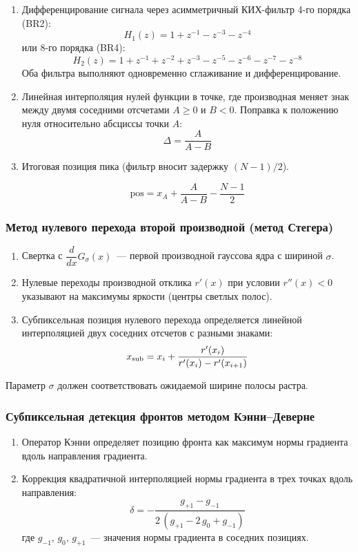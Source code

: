 \begin{enumerate}
\item Дифференцирование сигнала через асимметричный КИХ-фильтр 4-го порядка (BR2):
$$
H_1(z) = 1 + z^{-1} - z^{-3} - z^{-4}
$$
или 8-го порядка (BR4):
$$
H_2(z) = 1 + z^{-1} + z^{-2} + z^{-3} - z^{-5} - z^{-6} - z^{-7} - z^{-8}
$$
Оба фильтра выполняют одновременно сглаживание и дифференцирование.

\item Линейная интерполяция нулей функции в точке, где производная меняет знак между
двумя соседними отсчетами $A \geq 0$ и $B < 0$. 
Поправка к положению нуля относительно абсциссы точки $A$:
$$
\Delta = \frac{A}{A - B}
$$

\item Итоговая позиция пика (фильтр вносит задержку $(N-1)/2$).

$$\mathrm{pos} = x_A + \frac{A}{A-B} - \frac{N-1}{2}$$

\end{enumerate}

\subsubsection{Метод нулевого перехода второй производной (метод Стегера) \cite{steger_subpixel}}

\begin{enumerate}
\item Свертка с $\dfrac{d}{dx}G_\sigma(x)$~--- первой производной гауссова ядра
с шириной $\sigma$.

\item Нулевые переходы производной отклика $r'(x)$ при условии $r''(x) < 0$ указывают
на максимумы яркости (центры светлых полос).

\item Субпиксельная позиция нулевого перехода определяется линейной
интерполяцией двух соседних отсчетов с разными знаками:
$$
x_{\rm sub} = x_i + \frac{r'(x_i)}{r'(x_i) - r'(x_{i+1})}
$$
\end{enumerate}

Параметр $\sigma$ должен соответствовать ожидаемой ширине полосы растра.

\subsubsection{Субпиксельная детекция фронтов методом Кэнни–Деверне \cite{gioi_canny_devernay}}

\begin{enumerate}
\item Оператор Кэнни определяет позицию фронта как максимум нормы градиента вдоль
направления градиента.

\item Коррекция квадратичной интерполяцией нормы градиента в трех точках вдоль направления:
$$
\delta = -\frac{g_{+1} - g_{-1}}{2\,(g_{+1} - 2\,g_0 + g_{-1})}
$$
где $g_{-1},\, g_0,\, g_{+1}$~--- значения нормы градиента в соседних позициях.
\end{enumerate}

